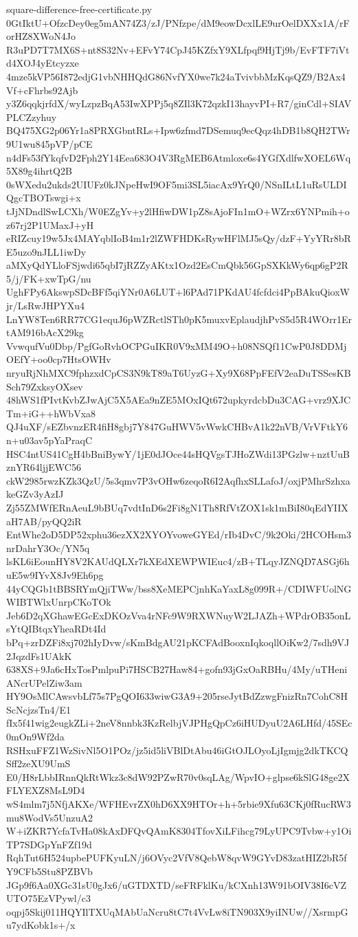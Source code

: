 \documentclass[11pt]{article}
\theoremstyle{definition}
\theoremstyle{remark}
\begin{document}
\begin{filecontents*}[overwrite]{square-difference-free-certificate.py}
0GtIktU+OfzcDey0eg5mAN74Z3/zJ/PNfzpe/dM9eowDcxlLE9urOelDXXx1A/rForHZ8XWoN4Jo
R3uPD7T7MX6S+nt8S32Nv+EFvY74CpJ45KZfxY9XLfpqf9HjTj9b/EvFTF7iVtd4XOJ4yEtcyzxe
4mze5kVP56I872edjG1vbNHHQdG86NvfYX0we7k24aTvivbbMzKqsQZ9/B2Ax4Vf+cFhrbs92Ajb
y3Z6qqkjrfdX/wyLzpzBqA53IwXPPj5q8ZIl3K72qzkI13hayvPI+R7/ginCdl+SIAVPLCZzyhuy
BQ475XG2p06Yr1a8PRXGbntRLs+Ipw6zfmd7DSemuq9ecQqz4hDB1b8QH2TWr9U1wu845pVP/pCE
n4dFs53fYkqfvD2Fph2Y14Eea683O4V3RgMEB6Atmloxe6s4YGfXdlfwXOEL6Wq5X89g4ihrtQ2B
0sWXedu2ukds2UIUFz0kJNpeHwI9OF5mi3SL5iacAx9YrQ0/NSnILtL1uRsULDIQgcTBOTswgi+x
tJjNDndlSwLCXh/W0EZgYv+y2lHfiwDW1pZ8sAjoFIn1mO+WZrx6YNPmih+oz67rj2P1UMaxJ+yH
eRIZcuy19w5Jx4MAYqblIoB4m1r2lZWFHDKsRywHFlMJ5sQy/dzF+YyYRr8bRE5uzo9nJLL1iwDy
aMXyQdYLloFSjwdi65qbI7jRZZyAKtx1Ozd2EsCmQbk56GpSXKkWy6qp6gP2R5/j/FK+xwTpG/nu
UghFPy6AkswpSDcBFf5qiYNr0A6LUT+l6PAd71PKdAU4fcfdci4PpBAkuQioxWjr/LsRwJHPYXu4
LnYW8Ten6RR77CG1equJ6pWZRctlSTh0pK5muxvEplaudjhPvS5d5R4WOrr1ErtAM916bAcX29kg
VvwqufVu0Dbp/PgfGoRvhOCPGuIKR0V9xMM49O+h08NSQf11CwP0J8DDMjOEfY+oo0cp7HtsOWHv
nryuRjNhMXC9fphzxdCpCS3N9kT89aT6UyzG+Xy9X68PpFEfV2eaDuTSSesKBSch79ZxksyOXsev
48hWS1fPIvtKvbZJwAjC5X5AEa9nZE5MOxIQt672upkyrdcbDu3CAG+vrz9XJCTm+iG++hWbVxa8
QJ4uXF/sEZbvnzER4fiH8gbj7Y847GuHWV5vWwkCHBvA1k22nVB/VrVFtkY6n+u03av5pYaPraqC
HSC4ntUS41CgH4bBniBywY/1jE0dJOce44sHQVgsTJHoZWdi13PGzlw+nztUuBznYR64ljjEWC56
ckW2985rwzKZk3QzU/5s3qmv7P3vOHw6zeqoR6I2AqfhxSLLafoJ/oxjPMhrSzhxakeGZv3yAzIJ
Zj55ZMWfERnAeuL9bBUq7vdtInD6s2Fi8gN1Th8RfVtZOX1sk1mBiI80qEdYIIXaH7AB/pyQQ2iR
EntWhe2oD5DP52xphu36ezXX2XYOYvoweGYEd/rIb4DvC/9k2Oki/2HCOHsm3nrDahrY3Oc/YN5q
lsKL6iEounHY8V2KAUdQLXr7kXEdXEWPWIEuc4/zB+TLqyJZNQD7ASGj6huE5w9IYvX8Jv9Eh6pg
44yCQGb1tBBSRYmQjiTWw/bss8XeMEPCjnhKaYaxL8g099R+/CDIWFUolNGWIBTWlxUnrpCKoTOk
Jeb6D2qXGhawEGcExDKOzVva4rNFc9W9RXWNuyW2LJAZh+WPdrOB35onLsYtQIBtqxYheaRDt4Id
bPq+zrDZFi8xj702hIyDvw/sKmBdgAU21pKCFAdBooxnIqkoqllOiKw2/7sdh9VJ2JqzdFs1UAkK
638XS+9Ja6cHxTosPmlpuPi7HSCB27Haw84+gofn93jGxOaRBHu/4My/uTHeniANcrUPelZiw3am
HY9OsMlCAwsvbLf75s7PgQOI633wiwG3A9+205rseJytBdZzwgFnizRn7CohC8HScNcjzsTn4/E1
fIx5f41wig2eugkZLi+2neV8nnbk3KzRelbjVJPHgQpCz6iHUDyuU2A6LHfd/45SEc0mOn9Wf2da
RSHxuFFZ1WzSivNl5O1POz/jz5id5liVBlDtAbu46iGtOJLOyoLjIgmjg2dkTKCQSff2zeXU9UmS
E0/H8rLbbIRnnQkRtWkz3c8dW92PZwR70v0sqLAg/WpvIO+glpse6kSlG48ge2XFLYEXZ8MsL9D4
wS4mlm7j5NfjAKXe/WFHEvrZX0hD6XX9HTOr+h+5rbie9Xfu63CKj0fRucRW3mu8WodVs5UnzuA2
W+iZKR7YcfaTvHa08kAxDFQvQAmK8304TfovXiLFihcg79LyUPC9Tvbw+y1OiTP7SDGpYnFZf19d
RqhTut6H524upbePUFKyuLN/j6OVyc2VfV8QebW8qvW9GYvD83zatHIZ2bR5fY9CFb5Stu8PZBVb
JGp9f6Aa0XGc31sU0gJx6/uGTDXTD/seFRFklKu/kCXnh13W91bOIV38I6cVZUTO75EzVPywl/c3
oqpj5Skij011HQYIlTXUqMAbUaNcru8tC7t4VvLw8iTN903X9yiINUw//XsrmpGu7ydKobk1s+/x

\end{filecontents*}
\end{document}
